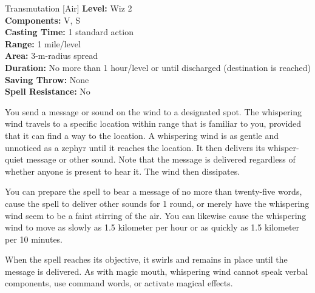 {Transmutation [Air]}
{
	\textbf{Level:}
	Wiz 2\\
	\textbf{Components:}
	V, S\\
	\textbf{Casting Time:}
	1 standard action\\
	\textbf{Range:}
	1 mile/level\\
	\textbf{Area:}
	3-m-radius spread\\
	\textbf{Duration:}
	No more than 1 hour/level or until discharged (destination is reached)\\
	\textbf{Saving Throw:}
	None\\
	\textbf{Spell Resistance:}
	No\\
}
{
	You send a message or sound on the wind to a designated spot. The whispering wind travels to a specific location within range that is familiar to you, provided that it can find a way to the location. A whispering wind is as gentle and unnoticed as a zephyr until it reaches the location. It then delivers its whisper-quiet message or other sound. Note that the message is delivered regardless of whether anyone is present to hear it. The wind then dissipates.

	You can prepare the spell to bear a message of no more than twenty-five words, cause the spell to deliver other sounds for 1 round, or merely have the whispering wind seem to be a faint stirring of the air. You can likewise cause the whispering wind to move as slowly as 1.5 kilometer per hour or as quickly as 1.5 kilometer per 10 minutes.

	When the spell reaches its objective, it swirls and remains in place until the message is delivered. As with magic mouth, whispering wind cannot speak verbal components, use command words, or activate magical effects.

}
